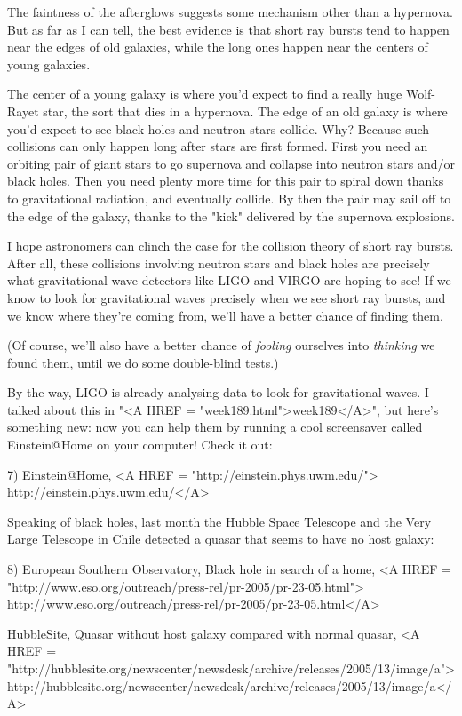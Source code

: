 The faintness of the afterglows suggests some mechanism other than a 
hypernova.  But as far as I can tell, the best evidence is that short
\gamma  ray bursts tend to happen near the edges of old galaxies, while 
the long ones happen near the centers of young galaxies.  

The center of a young galaxy is where you'd expect to find a really 
huge Wolf-Rayet star, the sort that dies in a hypernova.  The edge of 
an old galaxy is where you'd expect to see black holes and neutron 
stars collide.  Why?  Because such collisions can only happen long 
after stars are first formed.  First you need an orbiting pair of 
giant stars to go supernova and collapse into neutron stars and/or 
black holes.  Then you need plenty more time for this pair to spiral 
down thanks to gravitational radiation, and eventually collide.
By then the pair may sail off to the edge of the galaxy, thanks to 
the "kick" delivered by the supernova explosions. 

I hope astronomers can clinch the case for the collision theory of
short \gamma  ray bursts.  After all, these collisions involving 
neutron stars and black holes are precisely what gravitational wave 
detectors like LIGO and VIRGO are hoping to see!  If we know to look 
for gravitational waves precisely when we see short \gamma  ray bursts, 
and we know where they're coming from, we'll have a better chance of 
finding them.

(Of course, we'll also have a better chance of \emph{fooling} ourselves
into \emph{thinking} we found them, until we do some double-blind tests.)

By the way, LIGO is already analysing data to look for gravitational
waves.  I talked about this in 
"<A HREF = "week189.html">week189</A>", but here's something new:
now you can help them by running a cool screensaver called 
Einstein@Home on your computer!  Check it out:

7) Einstein@Home, <A HREF = "http://einstein.phys.uwm.edu/">
http://einstein.phys.uwm.edu/</A>

Speaking of black holes, last month the Hubble Space Telescope and
the Very Large Telescope in Chile detected a quasar that seems
to have no host galaxy:

8) European Southern Observatory, Black hole in search of a home,
<A HREF = "http://www.eso.org/outreach/press-rel/pr-2005/pr-23-05.html">
http://www.eso.org/outreach/press-rel/pr-2005/pr-23-05.html</A>

HubbleSite, Quasar without host galaxy compared with normal quasar,
<A HREF = "http://hubblesite.org/newscenter/newsdesk/archive/releases/2005/13/image/a">http://hubblesite.org/newscenter/newsdesk/archive/releases/2005/13/image/a</A>

